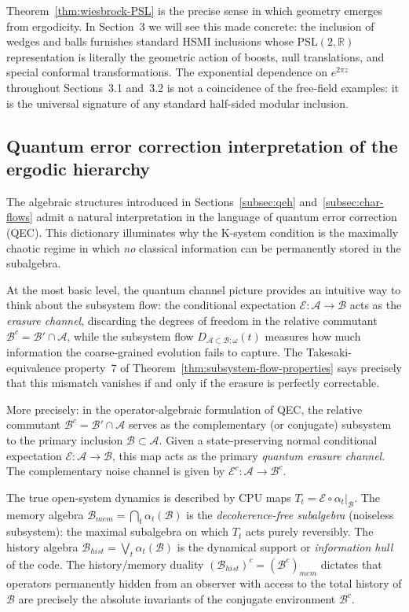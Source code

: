 \documentclass[a4paper,11pt]{article}
\theoremstyle{definition}
\theoremstyle{remark}
\newcommand{\mA}{\mathcal{A}}
\newcommand{\mB}{\mathcal{B}}
\newcommand{\mE}{\mathcal{E}}
\newcommand{\PSL}{\mathrm{PSL}(2,\mathbb{R})}
\begin{document}
Theorem~\ref{thm:wiesbrock-PSL} is the precise sense in which geometry emerges from
ergodicity.  In Section~3 we will see this made concrete: the inclusion of wedges and
balls furnishes standard HSMI inclusions whose $\PSL$ representation is literally the
geometric action of boosts, null translations, and special conformal transformations.
The exponential dependence on $e^{2\pi z}$ throughout Sections~3.1 and~3.2 is not a
coincidence of the free-field examples: it is the universal signature of any standard
half-sided modular inclusion.
 
\begingroup\color{blue}\subsection{Quantum error correction interpretation of the ergodic hierarchy}
\label{subsec:QEC-ergodic}
 
The algebraic structures introduced in Sections~\ref{subsec:qeh} and~\ref{subsec:char-flows}
admit a natural interpretation in the language of quantum error correction (QEC).  This
dictionary illuminates why the K-system condition is the maximally chaotic regime in
which \emph{no} classical information can be permanently stored in the subalgebra.
 
At the most basic level, the quantum channel picture provides an intuitive way to think
about the subsystem flow: the conditional expectation $\mE:\mA\to\mB$ acts as the
\emph{erasure channel}, discarding the degrees of freedom in the relative commutant
$\mB^c=\mB'\cap\mA$, while the subsystem flow $D_{\mA\subset\mB;\omega}(t)$ measures
how much information the coarse-grained evolution fails to capture.  The
Takesaki-equivalence property~7 of Theorem~\ref{thm:subsystem-flow-properties} says
precisely that this mismatch vanishes if and only if the erasure is perfectly correctable.
 
More precisely: in the operator-algebraic formulation of QEC, the relative commutant
$\mB^c = \mB' \cap \mA$ serves as the complementary (or conjugate) subsystem to the
primary inclusion $\mB \subset \mA$.  Given a state-preserving normal conditional
expectation $\mathcal{E}: \mathcal{A} \to \mathcal{B}$, this map acts as the primary
\emph{quantum erasure channel}.  The complementary noise channel is given by
$\mathcal{E}^c: \mathcal{A} \to \mathcal{B}^c$.
 
The true open-system dynamics is described by CPU maps
$T_t = \mathcal{E} \circ \alpha_t|_\mathcal{B}$.  The memory algebra
$\mathcal{B}_{mem} = \bigcap_{t} \alpha_t(\mathcal{B})$ is the
\emph{decoherence-free subalgebra} (noiseless subsystem): the maximal subalgebra on
which $T_t$ acts purely reversibly.  The history algebra
$\mathcal{B}_{hist} = \bigvee_{t} \alpha_t(\mathcal{B})$ is the dynamical support or
\emph{information hull} of the code.  The history/memory duality
$({\mathcal{B}_{hist}})^c = ({\mathcal{B}^c})_{mem}$ dictates that operators permanently
hidden from an observer with access to the total history of $\mathcal{B}$ are precisely
the absolute invariants of the conjugate environment $\mathcal{B}^c$.
 
\end{document}

